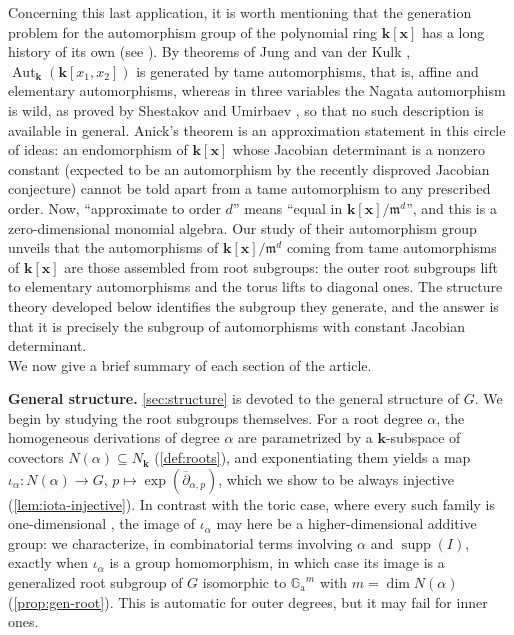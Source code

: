 \documentclass[11pt,letterpaper,reqno]{amsart}
\theoremstyle{remark}
\theoremstyle{definition}
\def\M{\mathfrak{m}}
\def\XX{\mathbf{x}}
\newcommand{\KK}[0]{\ensuremath{\mathbf{k}}}
\newcommand{\GA}[0]{\ensuremath{\mathbb{G}_{\mathrm{a}}}}
\newcommand{\supp}[0]{\ensuremath{\operatorname{supp}}}
\newcommand{\Aut}[0]{\ensuremath{\operatorname{Aut}}}
\begin{document}
Concerning this last application, it is worth mentioning that the generation problem for the automorphism group of the polynomial ring $\KK[\XX]$ has a long history of its own (see \cite[\S5.1]{vdE00}). By theorems of Jung \cite{Jung42} and van der Kulk \cite{Kulk53}, $\Aut_\KK(\KK[x_1,x_2])$ is generated by tame automorphisms, that is, affine and elementary automorphisms, whereas in three variables the Nagata automorphism \cite{Nagata72} is wild, as proved by Shestakov and Umirbaev \cite{SU04}, so that no such description is available in general. Anick's theorem \cite{Anick83} is an approximation statement in this circle of ideas: an endomorphism of $\KK[\XX]$ whose Jacobian determinant is a nonzero constant (expected to be an automorphism by the recently disproved Jacobian conjecture) cannot be told apart from a tame automorphism to any prescribed order. Now, ``approximate to order $d$'' means ``equal in $\KK[\XX]/\M^d$'', and this is a zero-dimensional monomial algebra. Our study of their automorphism group unveils that the automorphisms of $\KK[\XX]/\M^d$ coming from tame automorphisms of $\KK[\XX]$ are those assembled from root subgroups: the outer root subgroups lift to elementary automorphisms and the torus lifts to diagonal ones. The structure theory developed below identifies the subgroup they generate, and the answer is that it is precisely the subgroup of automorphisms with constant Jacobian determinant.\\

We now give a brief summary of each section of the article.

\medskip\noindent\textbf{General structure.} \cref{sec:structure} is devoted to
the general structure of $G$. We begin by studying the root subgroups themselves. For a
root degree $\alpha$, the homogeneous derivations of degree $\alpha$ are parametrized by a
$\KK$-subspace of covectors $N(\alpha)\subseteq N_\KK$ (\cref{def:roots}), and
exponentiating them yields a map $\iota_\alpha\colon N(\alpha)\to G$,
$p\mapsto\exp(\overline\partial_{\alpha,p})$, which we show to be always injective (\cref{lem:iota-injective}). In
contrast with the toric case, where every such family is one-dimensional
\cite[Th\'eor\`eme~2\,(b)]{demazure1970sous}, the image of $\iota_\alpha$ may here be a
higher-dimensional additive group: we characterize, in combinatorial terms involving
$\alpha$ and $\supp(I)$, exactly when $\iota_\alpha$ is a group homomorphism, in which
case its image is a generalized root subgroup of $G$ isomorphic to $\GA^m$ with
$m=\dim N(\alpha)$ (\cref{prop:gen-root}). This is automatic for outer degrees, but it may fail for inner ones.
\end{document}
